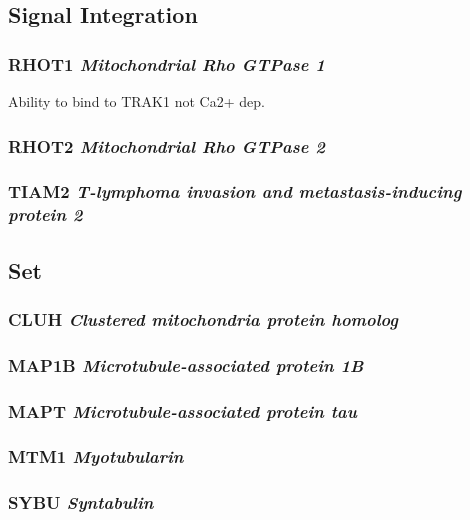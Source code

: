 \subsection{Signal Integration}

\subsubsection{RHOT1 \textit{Mitochondrial Rho GTPase 1}}

Ability to bind to TRAK1 not Ca2+ dep.

\subsubsection{RHOT2 \textit{Mitochondrial Rho GTPase 2}}

\subsubsection{TIAM2 \textit{T-lymphoma invasion and metastasis-inducing protein 2}}

\subsection{Set}

\subsubsection{CLUH \textit{Clustered mitochondria protein homolog}}

\subsubsection{MAP1B \textit{Microtubule-associated protein 1B}}

\subsubsection{MAPT \textit{Microtubule-associated protein tau}}

\subsubsection{MTM1 \textit{Myotubularin}}

\subsubsection{SYBU \textit{Syntabulin}}


